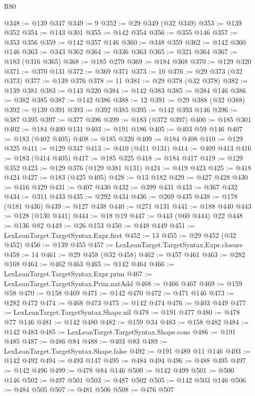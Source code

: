 \begin{lexlean}{R80}
\begin{coremodule}
@348 := @139 @347
@349 := 9
@352 := @29 @349 (@32 @349)
@353 := @139 @352
@354 := @143 @301
@355 := @142 @354
@356 := @355 @146
@357 := @353 @356
@359 := @142 @357 @146
@360 := @348 @359
@362 := @142 @360 @146
@363 := @343 @362
@364 := @336 @363
@365 := @321 @364
@367 := @183 (@316 @365)
@368 := @185 @279
@369 := @184 @368
@370 := @129 @320
@371 := @370 @131
@372 := @369 @371
@373 := 10
@376 := @29 @373 (@32 @373)
@377 := @139 @376
@378 := 11
@381 := @29 @378 (@32 @378)
@382 := @139 @381
@383 := @143 @320
@384 := @142 @383
@385 := @384 @146
@386 := @382 @385
@387 := @142 @386
@388 := 12
@391 := @29 @388 (@32 @388)
@392 := @139 @391
@393 := @392 @385
@395 := @142 @393 @146
@396 := @387 @395
@397 := @377 @396
@399 := @183 (@372 @397)
@400 := @185 @301
@402 := @184 @400 @131
@403 := @191 @186
@405 := @403 @59 @146
@407 := @183 (@402 @405)
@408 := @185 @320
@409 := @184 @408
@410 := @129 @325
@411 := @129 @347
@413 := @410 (@411 @131)
@414 := @409 @413
@416 := @183 (@414 @405)
@417 := @185 @325
@418 := @184 @417
@419 := @129 @352
@423 := @129 @376 (@129 @381 @131)
@424 := @419 @423
@425 := @418 @424
@427 := @183 (@425 @405)
@428 := @13 @182
@429 := @427 @428
@430 := @416 @429
@431 := @407 @430
@432 := @399 @431
@433 := @367 @432
@434 := @311 @433
@435 := @292 @434
@436 := @269 @435
@438 := @178 (@181 @436)
@439 := @127 @438
@440 := @271 @131
@441 := @188 @440
@443 := @128 (@130 @441)
@444 := @18 @19
@447 := @443 (@60 @444) @22
@448 := @136 @82
@449 := @26 @153
@450 := @448 @449
@451 := LexLeanTarget.TargetSyntax.Expr.first
@452 := 13
@455 := @29 @452 (@32 @452)
@456 := @139 @455
@457 := LexLeanTarget.TargetSyntax.Expr.closure
@458 := 14
@461 := @29 @458 (@32 @458)
@462 := @457 @461
@463 := @282 @168
@464 := @462 @463
@465 := @142 @464
@466 := LexLeanTarget.TargetSyntax.Expr.prim
@467 := LexLeanTarget.TargetSyntax.Prim.natAdd
@468 := @466 @467
@469 := @159 @58
@470 := @158 @469
@471 := @142 @470
@472 := @471 @146
@473 := @282 @472
@474 := @468 @473
@475 := @142 @474
@476 := @403 @449
@477 := LexLeanTarget.TargetSyntax.Shape.nil
@478 := @191 @477
@480 := @478 @77 @146
@481 := @142 @480
@482 := @159 @34
@483 := @158 @482
@484 := @142 @483
@485 := LexLeanTarget.TargetSyntax.Shape.cons
@486 := @191 @485
@487 := @486 @84
@488 := @403 @83
@489 := LexLeanTarget.TargetSyntax.Shape.false
@492 := @191 @489 @11 @146
@493 := @142 @492
@494 := @493 @147
@495 := @484 @494
@496 := @488 @495
@497 := @142 @496
@499 := @478 @84 @146
@500 := @142 @499
@501 := @500 @146
@502 := @497 @501
@503 := @487 @502
@505 := @142 @503 @146
@506 := @484 @505
@507 := @481 @506
@508 := @476 @507

\end{coremodule}
\end{lexlean}

